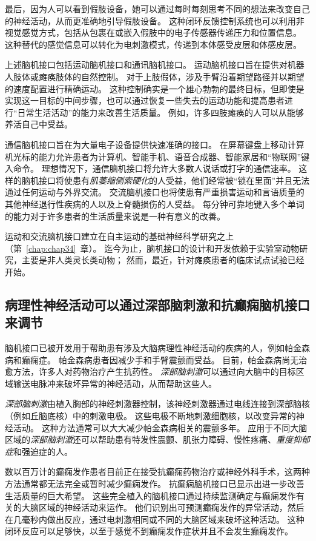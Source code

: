 最后，因为人可以看到假肢设备，她可以通过每时每刻思考不同的想法来改变自己的神经活动，从而更准确地引导假肢设备。
这种闭环反馈控制系统也可以利用非视觉感觉方式，包括从包裹在或嵌入假肢中的电子传感器传递压力和位置信息。
这种替代的感觉信息可以转化为电刺激模式，传递到本体感受皮层和体感皮层。


上述脑机接口包括运动脑机接口和通讯脑机接口。
运动脑机接口旨在提供对机器人肢体或瘫痪肢体的自然控制。
对于上肢假体，涉及手臂沿着期望路径并以期望的速度配置进行精确运动。
这种控制确实是一个雄心勃勃的最终目标，但即使是实现这一目标的中间步骤，也可以通过恢复一些失去的运动功能和提高患者进行“日常生活活动”的能力来改善生活质量。
例如，许多四肢瘫痪的人可以从能够养活自己中受益。


通信脑机接口旨在为大量电子设备提供快速准确的接口。
在屏幕键盘上移动计算机光标的能力允许患者为计算机、智能手机、语音合成器、智能家居和“物联网”键入命令。 
理想情况下，通信脑机接口将允许大多数人说话或打字的通信速率。
这样的脑机接口将使患有\textit{肌萎缩侧索硬化}的人受益，他们经常被“锁在里面”并且无法通过任何运动与外界交流。
交流脑机接口也将使患有严重损害运动和言语质量的其他神经退行性疾病的人以及上脊髓损伤的人受益。
每分钟可靠地键入多个单词的能力对于许多患者的生活质量来说是一种有意义的改善。


运动和交流脑机接口建立在自主运动的基础神经科学研究之上（第~\ref{chap:chap34}~章）。 
迄今为止，脑机接口的设计和开发依赖于实验室动物研究，主要是非人类灵长类动物；
然而，最近，针对瘫痪患者的临床试点试验已经开始。



\subsection{病理性神经活动可以通过深部脑刺激和抗癫痫脑机接口来调节}

脑机接口已被开发用于帮助患有涉及大脑病理性神经活动的疾病的人，例如帕金森病和癫痫症。
帕金森病患者因减少手和手臂震颤而受益。 
目前，帕金森病尚无治愈方法，许多人对药物治疗产生抗药性。
\textit{深部脑刺激}可以通过向大脑中的目标区域输送电脉冲来破坏异常的神经活动，从而帮助这些人。


\textit{深部脑刺激}由植入胸部的神经刺激器控制，该神经刺激器通过电线连接到深部脑核（例如丘脑底核）中的刺激电极。 
这些电极不断地刺激细胞核，以改变异常的神经活动。 
这种方法通常可以大大减少帕金森病相关的震颤多年。 
应用于不同大脑区域的\textit{深部脑刺激}还可以帮助患有特发性震颤、肌张力障碍、慢性疼痛、\textit{重度抑郁症}和强迫症的人。


数以百万计的癫痫发作患者目前正在接受抗癫痫药物治疗或神经外科手术，这两种方法通常都无法完全或暂时减少癫痫发作。
抗癫痫脑机接口已显示出进一步改善生活质量的巨大希望。 
这些完全植入的脑机接口通过持续监测确定与癫痫发作有关的大脑区域的神经活动来运作。 
他们识别出可预测癫痫发作的异常活动，然后在几毫秒内做出反应，通过电刺激相同或不同的大脑区域来破坏这种活动。 
这种闭环反应可以足够快，以至于感觉不到癫痫发作症状并且不会发生癫痫发作。




